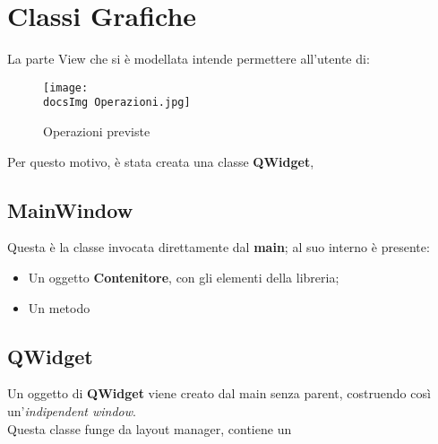 \section{Classi Grafiche}{
	La parte View che si è modellata intende permettere all'utente di:

	\begin{figure}[h]
			\begin{center}
				\texttt{[image: \\docsImg Operazioni.jpg]}
				\caption{Operazioni previste}
			\end{center}
	\end{figure}
	
	Per questo motivo, è stata creata una classe \textbf{QWidget},
	\subsection{MainWindow}{
		Questa è la classe invocata direttamente dal \textbf{main}; al suo interno è presente:
		\begin{itemize}\itemsep=0.5pt
			\item Un oggetto \textbf{Contenitore}, con gli elementi della libreria;
			\item Un metodo 
		\end{itemize}
	}
	
	\subsection{QWidget}{
		Un oggetto di \textbf{QWidget} viene creato dal main senza parent, costruendo così un'\textit{indipendent window}. \\
		Questa classe funge da layout manager, contiene un 
	}
}